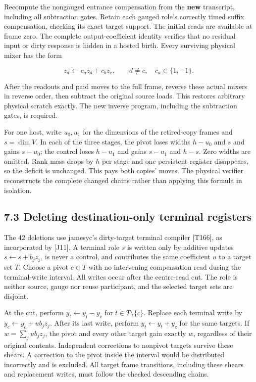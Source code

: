\documentclass[
  11pt,
]{article}
\begin{document}
Recompute the nongauged entrance compensation from the \textbf{new}
transcript, including all subtraction gates. Retain each gauged role's
correctly timed suffix compensation, checking its exact target support.
The initial reads are available at frame zero. The complete
output-coefficient identity verifies that no residual input or dirty
response is hidden in a hosted birth. Every surviving physical mixer has
the form

\[
z_d\leftarrow c_a z_d+c_b z_c,\qquad d\ne c,\quad c_a\in\{1,-1\}.
\]

After the readouts and paid moves to the full frame, reverse these
actual mixers in reverse order, then subtract the original source loads.
This restores arbitrary physical scratch exactly. The new inverse
program, including the subtraction gates, is required.

For one host, write \(u_0,u_1\) for the dimensions of the retired-copy
frames and \(s=\dim V\). In each of the three stages, the pivot loses
widths \(h-u_0\) and \(s\) and gains \(s-u_0\); the control loses
\(h-u_1\) and gains \(s-u_1\) and \(h-s\). Zero widths are omitted. Rank
mass drops by \(h\) per stage and one persistent register disappears, so
the deficit is unchanged. This pays both copies' moves. The physical
verifier reconstructs the complete changed chains rather than applying
this formula in isolation.

\subsection{7.3 Deleting destination-only terminal
registers}\label{deleting-destination-only-terminal-registers}

The 42 deletions use jamesyc's dirty-target terminal compiler
{[}T166{]}, as incorporated by {[}J11{]}. A terminal role \(s\) is
written only by additive updates \(s\leftarrow s+b_jz_j\), is never a
control, and contributes the same coefficient \(u\) to a target set
\(T\). Choose a pivot \(c\in T\) with no intervening compensation read
during the terminal-write interval. All writes occur after the
centre-read cut. The role is neither source, gauge nor reuse
participant, and the selected target sets are disjoint.

At the cut, perform \(y_t\leftarrow y_t-y_c\) for
\(t\in T\setminus\{c\}\). Replace each terminal write by
\(y_c\leftarrow y_c+ub_jz_j\). After its last write, perform
\(y_t\leftarrow y_t+y_c\) for the same targets. If \(w=\sum_j ub_jz_j\),
the pivot and every other target gain exactly \(w\), regardless of their
original contents. Independent corrections to nonpivot targets survive
these shears. A correction to the pivot inside the interval would be
distributed incorrectly and is excluded. All target frame transitions,
including these shears and replacement writes, must follow the checked
descending chains.
\end{document}
